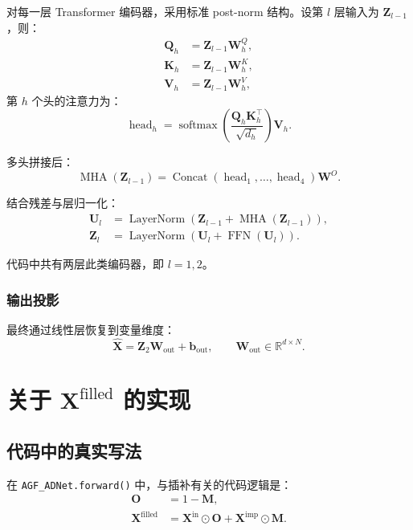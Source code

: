 \documentclass[UTF8]{ctexart}
\begin{document}
对每一层 Transformer 编码器，采用标准 post-norm 结构。设第 $l$ 层输入为 $\bm{Z}_{l-1}$，则：
\begin{align}
    \bm{Q}_h &= \bm{Z}_{l-1}\bm{W}_h^Q, \\
    \bm{K}_h &= \bm{Z}_{l-1}\bm{W}_h^K, \\
    \bm{V}_h &= \bm{Z}_{l-1}\bm{W}_h^V,
\end{align}
第 $h$ 个头的注意力为：
\begin{equation}
    \operatorname{head}_h
    =
    \operatorname{softmax}\!\left(
        \frac{\bm{Q}_h \bm{K}_h^\top}{\sqrt{d_h}}
    \right)\bm{V}_h.
\end{equation}

多头拼接后：
\begin{equation}
    \operatorname{MHA}(\bm{Z}_{l-1})
    =
    \operatorname{Concat}(\operatorname{head}_1,\dots,\operatorname{head}_4)\bm{W}^O.
\end{equation}

结合残差与层归一化：
\begin{align}
    \bm{U}_l &= \operatorname{LayerNorm}(\bm{Z}_{l-1} + \operatorname{MHA}(\bm{Z}_{l-1})), \\
    \bm{Z}_l &= \operatorname{LayerNorm}(\bm{U}_l + \operatorname{FFN}(\bm{U}_l)).
\end{align}

代码中共有两层此类编码器，即 $l=1,2$。

\subsubsection{输出投影}

最终通过线性层恢复到变量维度：
\begin{equation}
    \hat{\bm{X}} = \bm{Z}_2 \bm{W}_{\text{out}} + \bm{b}_{\text{out}},
    \qquad \bm{W}_{\text{out}} \in \mathbb{R}^{d \times N}.
\end{equation}

\section{关于 \texorpdfstring{$\bm{X}^{\text{filled}}$}{Xfilled} 的实现}

\subsection{代码中的真实写法}

在 \texttt{AGF\_ADNet.forward()} 中，与插补有关的代码逻辑是：
\begin{align}
    \bm{O} &= 1 - \bm{M}, \\
    \bm{X}^{\text{filled}} &= \bm{X}^{\text{in}} \odot \bm{O} + \bm{X}^{\text{imp}} \odot \bm{M}.
\end{align}
\end{document}
